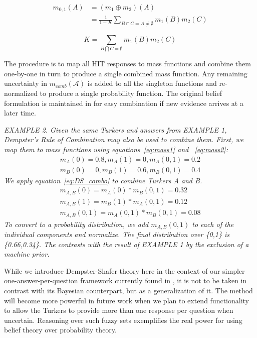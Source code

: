 \begin{equation}
\begin{split}
\label{eq:DS_combo}
m_{0,1}(A) &=(m_{1}\oplus m_{2})(A)\\
                   &=\frac{1}{1-K} \sum_{B\cap C=A\neq\emptyset} m_{1}(B)m_{2}(C)
\end{split}
\end{equation}

\begin{equation}
K=\sum_{B\bigcap C=\emptyset}m_{1}(B)m_{2}(C)
\end{equation}

The procedure is to map all HIT responses to mass functions and combine them one-by-one in turn to produce a single combined mass function.  Any remaining uncertainty in $m_{comb}(\mathcal{A})$ is added to all the singleton functions and re-normalized to produce a single probability function.  The original belief formulation is maintained in \sysName for easy combination if new evidence arrives at a later time.

\textit{
EXAMPLE 2. Given the same Turkers and answers from EXAMPLE 1, Dempster's Rule of Combination may also be used to combine them.  First, we map them to mass functions using equations~\ref{eq:mass1} and ~\ref{eq:mass2}:
\begin{align*}
m_{A}(0) = 0.8,  m_{A}(1) = 0,  m_{A}(0,1) = 0.2\\
m_{B}(0) = 0,  m_{B}(1) = 0.6,  m_{B}(0,1) = 0.4
\end{align*}
We apply equation~\ref{eq:DS_combo} to combine Turkers A and B.
\begin{align*}
m_{A,B}(0) = m_{A}(0)*m_{B}(0,1) = 0.32\\
m_{A,B}(1) = m_{B}(1)*m_{A}(0,1) = 0.12\\
m_{A,B}(0,1) = m_{A}(0,1)*m_{B}(0,1) = 0.08
\end{align*}
To convert to a probability distribution, we add $m_{A,B}(0,1)$ to each of the individual components and normalize.  The final distribution over \{0,1\} is \{0.66,0.34\}.  The contrasts with the result of EXAMPLE 1 by the exclusion of a machine prior.
}

While we introduce Dempster-Shafer theory here in the context of our simpler one-answer-per-question framework currently found in \sysName , it is not to be taken in contrast with its Bayesian counterpart, but as a generalization of it.  The method will become more powerful in future work when we plan to extend functionality to allow the Turkers to provide more than one response per question when uncertain.  Reasoning over such fuzzy sets exemplifies the real power for using belief theory over probability theory.

